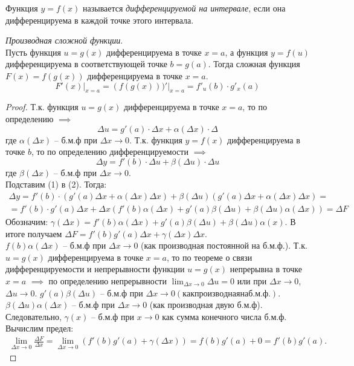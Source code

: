 \begin{definition}
  Функция $y = f(x)$ называется \textit{дифференцируемой на интервале}, если она дифференцируема в каждой точке этого интервала.
\end{definition}

\begin{theorem}
  \textit{Производная сложной функции}. \\
  Пусть функция $u = g(x)$ дифференцируема в точке $x = a$, а функция $y = f(u)$ дифференцируема в соответствующей точке  $b = g(a)$.
  Тогда сложная функция $F(x) = f(g(x))$ дифференцируема в точке $x = a$. \[
     F'(x) |_{x = a} = \left(f(g(x)))'\right|_{x = a} = f'_u(b) \cdot g'_x(a)
  \]
\end{theorem}
\begin{proof}
  Т.к. функция $u = g(x)$ дифференцируема в точке $x = a$, то по определению $\implies$\[
    \Delta u = g'(a) \cdot \Delta x + \alpha(\Delta x) \cdot \Delta \tag{1}
  \] 
  где $\alpha(\Delta x)$ -- б.м.ф при $\Delta x \to 0$.
  Т.к. функция $y = f(x)$ дифференцируема в точке  $b$, то по определению дифференцируемости  $\implies$ \[
    \Delta y = f'(b) \cdot \Delta u + \beta(\Delta u) \cdot \Delta u \tag{2}
  \] 
  где $\beta(\Delta x)$ -- б.м.ф при $\Delta x \to 0$. \\
  Подставим (1) в (2). Тогда:
  \begin{gather*}
    \Delta y = f'(b) \cdot \left( g'(a) \Delta x + \alpha(\Delta x) \Delta x \right) + \beta(\Delta u)\left( g'(a) \Delta x + \alpha(\Delta x) \Delta x \right) = \\
    = f'(b) \cdot  g'(a) \Delta x + \Delta x\left(f'(b) \alpha(\Delta x) + g'(a) \beta(\Delta u) + \beta(\Delta u) \alpha(\Delta x)\right) = \Delta F
  \end{gather*}
  Обозначим: $\gamma(\Delta x) = f'(b) \alpha(\Delta x) + g'(a) \beta(\Delta u) + \beta(\Delta u) \alpha(x)$. В итоге получаем $\Delta F = f'(b)g'(a)\Delta x + \gamma(\Delta x)\Delta x$. \\
  $f(b) \alpha(\Delta x)$ -- б.м.ф при $\Delta x \to 0$ (как производная постоянной на б.м.ф.). 
  Т.к. $u = g(x)$ дифференцируема в точке $x = a$, то по теореме о связи дифференцируемости и непрерывности функции $u = g(x)$ непрерывна в точке $x = a$  $\implies$ по определению непрерывности $\lim_{\Delta x \to 0} \Delta u = 0$ или при $\Delta x \to 0$, $\Delta u \to 0$. $g'(a) \beta(\Delta u)$ -- б.м.ф при $\Delta x \to  0 (как производная на б.м.ф.)$. $\beta(\Delta u) \alpha(\Delta x)$ -- б.м.ф при $\Delta x \to  0$ (как производная двую б.м.ф).
  Следовательно, $\gamma(x)$ -- б.м.ф при $x \to 0$ как сумма конечного числа б.м.ф. \\
  Вычислим предел:
  \begin{gather*}
    \lim_{\Delta x \to 0} \frac{\Delta F}{\Delta x} = \lim_{\Delta x \to 0} \left( f'(b) g'(a) + \gamma(\Delta x) \right) = f(b)g'(a) + 0 = f'(b) g'(a).
  \end{gather*}
\end{proof}

